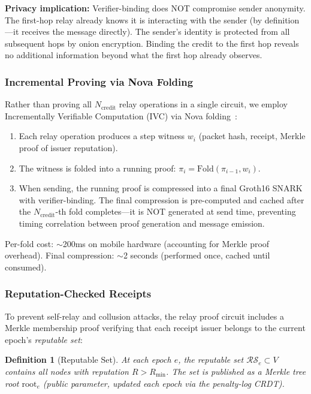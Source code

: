 \documentclass[11pt,a4paper]{article}
\newtheorem{definition}{Definition}
\begin{document}
\textbf{Privacy implication:} Verifier-binding does NOT compromise sender anonymity. The first-hop relay already knows it is interacting with the sender (by definition---it receives the message directly). The sender's identity is protected from all subsequent hops by onion encryption. Binding the credit to the first hop reveals no additional information beyond what the first hop already observes.

\subsubsection{Incremental Proving via Nova Folding}

Rather than proving all $N_{\text{credit}}$ relay operations in a single circuit, we employ Incrementally Verifiable Computation (IVC) via Nova folding~\cite{nova}:

\begin{enumerate}[nosep]
    \item Each relay operation produces a step witness $w_i$ (packet hash, receipt, Merkle proof of issuer reputation).
    \item The witness is folded into a running proof: $\pi_{i} = \text{Fold}(\pi_{i-1}, w_i)$.
    \item When sending, the running proof is compressed into a final Groth16 SNARK with verifier-binding. The final compression is pre-computed and cached after the $N_{\text{credit}}$-th fold completes---it is NOT generated at send time, preventing timing correlation between proof generation and message emission.
\end{enumerate}

Per-fold cost: $\sim$200ms on mobile hardware (accounting for Merkle proof overhead). Final compression: $\sim$2 seconds (performed once, cached until consumed).

\subsubsection{Reputation-Checked Receipts}
\label{sec:rep-receipts}

To prevent self-relay and collusion attacks, the relay proof circuit includes a Merkle membership proof verifying that each receipt issuer belongs to the current epoch's \emph{reputable set}:

\begin{definition}[Reputable Set]
At each epoch $e$, the reputable set $\mathcal{RS}_e \subset V$ contains all nodes with reputation $R > R_{\min}$. The set is published as a Merkle tree root $\text{root}_e$ (public parameter, updated each epoch via the penalty-log CRDT).
\end{definition}
\end{document}
